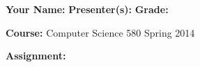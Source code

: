 \documentclass[letterpaper, 10pt]{article} %
\begin{document}
\pagestyle{empty}

\vspace*{-1.2in}

\noindent
{\bf Your Name:} \hspace*{2in} {\bf Presenter(s):} \hspace*{2in} {\bf Grade:} 

\vspace*{.1in}

\noindent
{\bf Course:} Computer Science 580 Spring 2014

\vspace*{.1in}

\noindent
{\bf Assignment:} 

\vspace*{.1in}
\end{document}
